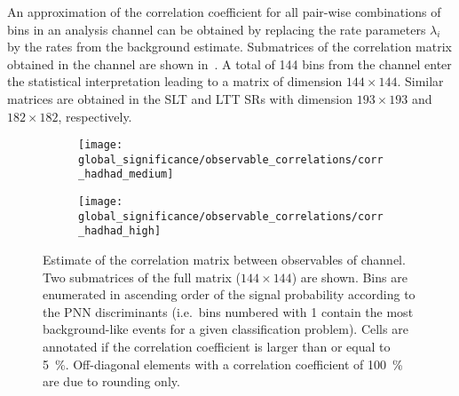 An approximation of the correlation coefficient for all pair-wise combinations
of bins in an analysis channel can be obtained by replacing the rate parameters
$\lambda_i$ by the rates from the background estimate. Submatrices of the
correlation matrix obtained in the \hadhad channel are shown
in~. A total of 144 bins from the
\hadhad channel enter the statistical interpretation leading to a matrix of
dimension $144 \times 144$. Similar matrices are obtained in the \lephad SLT and
LTT SRs with dimension $193 \times 193$ and $182 \times 182$, respectively.

\begin{figure}[htbp]
  \centering

  \begin{subfigure}{\textwidth}
    \centering

    \texttt{[image: global\_significance/observable\_correlations/corr\_hadhad\_medium]}
    \label{fig:correlation_matrix_observables_medium}
  \end{subfigure}

  \begin{subfigure}{\textwidth}
    \centering

    \texttt{[image: global\_significance/observable\_correlations/corr\_hadhad\_high]}
    \label{fig:correlation_matrix_observables_high}
  \end{subfigure}

  \caption{Estimate of the correlation matrix between observables of \hadhad
    channel. Two submatrices of the full matrix ($144 \times 144$) are
    shown. Bins are enumerated in ascending order of the signal probability
    according to the PNN discriminants (i.e.\ bins numbered with 1 contain the
    most background-like events for a given classification problem).  Cells are
    annotated if the correlation coefficient is larger than or equal to
    \SI{5}{\percent}. Off-diagonal elements with a correlation coefficient of
    \SI{100}{\percent} are due to rounding only.}%
  \label{fig:correlation_matrix_observables}
\end{figure}


